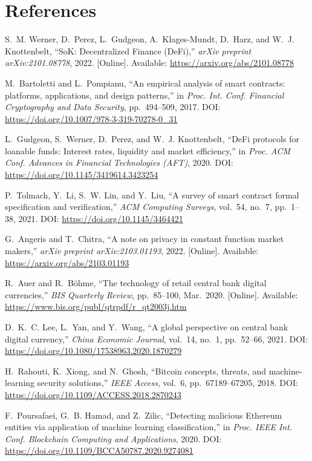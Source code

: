 \documentclass[11pt,a4paper]{article}
\begin{document}
\section{References}

{\small
\begin{enumerate}[label={[\arabic*]}]
\item S.~M. Werner, D.~Perez, L.~Gudgeon, A.~Klages-Mundt, D.~Harz, and W.~J. Knottenbelt, ``SoK: Decentralized Finance (DeFi),'' \textit{arXiv preprint arXiv:2101.08778}, 2022. [Online]. Available: \url{https://arxiv.org/abs/2101.08778}
\item M.~Bartoletti and L.~Pompianu, ``An empirical analysis of smart contracts: platforms, applications, and design patterns,'' in \textit{Proc. Int. Conf. Financial Cryptography and Data Security}, pp.~494--509, 2017. DOI: \url{https://doi.org/10.1007/978-3-319-70278-0_31}
\item L.~Gudgeon, S.~Werner, D.~Perez, and W.~J. Knottenbelt, ``DeFi protocols for loanable funds: Interest rates, liquidity and market efficiency,'' in \textit{Proc. ACM Conf. Advances in Financial Technologies (AFT)}, 2020. DOI: \url{https://doi.org/10.1145/3419614.3423254}
\item P.~Tolmach, Y.~Li, S.~W. Lin, and Y.~Liu, ``A survey of smart contract formal specification and verification,'' \textit{ACM Computing Surveys}, vol.~54, no.~7, pp.~1--38, 2021. DOI: \url{https://doi.org/10.1145/3464421}
\item G.~Angeris and T.~Chitra, ``A note on privacy in constant function market makers,'' \textit{arXiv preprint arXiv:2103.01193}, 2022. [Online]. Available: \url{https://arxiv.org/abs/2103.01193}
\item R.~Auer and R.~Böhme, ``The technology of retail central bank digital currencies,'' \textit{BIS Quarterly Review}, pp.~85--100, Mar.~2020. [Online]. Available: \url{https://www.bis.org/publ/qtrpdf/r_qt2003j.htm}
\item D.~K.~C. Lee, L.~Yan, and Y.~Wang, ``A global perspective on central bank digital currency,'' \textit{China Economic Journal}, vol.~14, no.~1, pp.~52--66, 2021. DOI: \url{https://doi.org/10.1080/17538963.2020.1870279}
\item H.~Rahouti, K.~Xiong, and N.~Ghosh, ``Bitcoin concepts, threats, and machine-learning security solutions,'' \textit{IEEE Access}, vol.~6, pp.~67189--67205, 2018. DOI: \url{https://doi.org/10.1109/ACCESS.2018.2870243}
\item F.~Poursafaei, G.~B. Hamad, and Z.~Zilic, ``Detecting malicious Ethereum entities via application of machine learning classification,'' in \textit{Proc. IEEE Int. Conf. Blockchain Computing and Applications}, 2020. DOI: \url{https://doi.org/10.1109/BCCA50787.2020.9274081}

\end{enumerate}}
\end{document}
